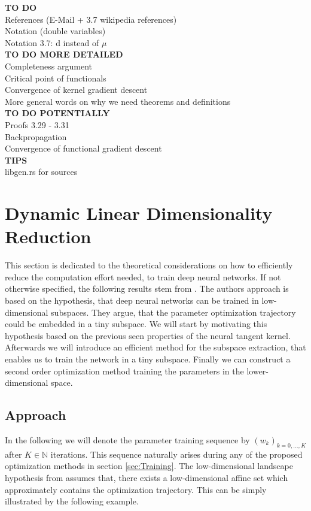 \documentclass[11pt, a4paper]{article}
\newcommand{\N}{\mathbb{N}}
\begin{document}
\textbf{TO DO} \\
References (E-Mail + 3.7 wikipedia references) \\
Notation (double variables) \\
Notation 3.7: d instead of $\mu$ \\

\textbf{TO DO MORE DETAILED} \\
Completeness argument \\
Critical point of functionals \\
Convergence of kernel gradient descent \\
More general words on why we need theorems and definitions \\

\textbf{TO DO POTENTIALLY} \\
Proofs 3.29 - 3.31 \\
Backpropagation \\
Convergence of functional gradient descent \\

\textbf{TIPS} \\
libgen.rs for sources \\

\pagebreak
\section{Dynamic Linear Dimensionality Reduction}

This section is dedicated to the theoretical considerations on how to efficiently reduce the computation effort needed, to train deep neural networks. If not otherwise specified, the following results stem from \cite{Paper}. The authors approach is based on the hypothesis, that deep neural networks can be trained in low-dimensional subspaces. They argue, that the parameter optimization trajectory could be embedded in a tiny subspace. We will start by motivating this hypothesis based on the previous seen properties of the neural tangent kernel. Afterwards we will introduce an efficient method for the subspace extraction, that enables us to train the network in a tiny subspace. Finally we can construct a second order optimization method training the parameters in the lower-dimensional space.

\subsection{Approach}

In the following we will denote the parameter training sequence by $(w_k)_{k=0, \dots, K}$ after $K \in \N$ iterations. This sequence naturally arises during any of the proposed optimization methods in section \ref{sec:Training}. The low-dimensional landscape hypothesis from \cite{Paper} assumes that, there exists a low-dimensional affine set which approximately contains the optimization trajectory. This can be simply illustrated by the following example.
\end{document}
